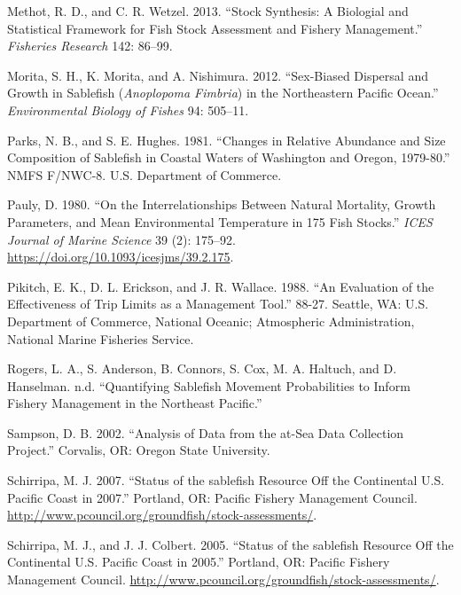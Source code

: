 \documentclass[11pt,
  english,
  a4paper,
]{article}
\newlength{\cslhangindent}
\newenvironment{cslreferences}%
  {\setlength{\parindent}{0pt}%
  \everypar{\setlength{\hangindent}{\cslhangindent}}\ignorespaces}%
  {\par}
\begin{document}
\begin{cslreferences}
\leavevmode\hypertarget{ref-MethotWetzel2013}{}%
Methot, R. D., and C. R. Wetzel. 2013. ``Stock Synthesis: A Biologial and Statistical Framework for Fish Stock Assessment and Fishery Management.'' \emph{Fisheries Research} 142: 86--99.

\leavevmode\hypertarget{ref-morita2012envbiofishsex}{}%
Morita, S. H., K. Morita, and A. Nishimura. 2012. ``Sex-Biased Dispersal and Growth in Sablefish (\emph{Anoplopoma Fimbria}) in the Northeastern Pacific Ocean.'' \emph{Environmental Biology of Fishes} 94: 505--11.

\leavevmode\hypertarget{ref-parks1981}{}%
Parks, N. B., and S. E. Hughes. 1981. ``Changes in Relative Abundance and Size Composition of Sablefish in Coastal Waters of Washington and Oregon, 1979-80.'' NMFS F/NWC-8. U.S. Department of Commerce.

\leavevmode\hypertarget{ref-pauly1980}{}%
Pauly, D. 1980. ``On the Interrelationships Between Natural Mortality, Growth Parameters, and Mean Environmental Temperature in 175 Fish Stocks.'' \emph{ICES Journal of Marine Science} 39 (2): 175--92. \url{https://doi.org/10.1093/icesjms/39.2.175}.

\leavevmode\hypertarget{ref-pikitch1988usdoc}{}%
Pikitch, E. K., D. L. Erickson, and J. R. Wallace. 1988. ``An Evaluation of the Effectiveness of Trip Limits as a Management Tool.'' 88-27. Seattle, WA: U.S. Department of Commerce, National Oceanic; Atmospheric Administration, National Marine Fisheries Service.

\leavevmode\hypertarget{ref-rogers2020}{}%
Rogers, L. A., S. Anderson, B. Connors, S. Cox, M. A. Haltuch, and D. Hanselman. n.d. ``Quantifying Sablefish Movement Probabilities to Inform Fishery Management in the Northeast Pacific.''

\leavevmode\hypertarget{ref-sampson2002}{}%
Sampson, D. B. 2002. ``Analysis of Data from the at-Sea Data Collection Project.'' Corvalis, OR: Oregon State University.

\leavevmode\hypertarget{ref-schirripa2007sablefish}{}%
Schirripa, M. J. 2007. ``Status of the sablefish Resource Off the Continental U.S. Pacific Coast in 2007.'' Portland, OR: Pacific Fishery Management Council. \url{http://www.pcouncil.org/groundfish/stock-assessments/}.

\leavevmode\hypertarget{ref-schirripa2005sablefish}{}%
Schirripa, M. J., and J. J. Colbert. 2005. ``Status of the sablefish Resource Off the Continental U.S. Pacific Coast in 2005.'' Portland, OR: Pacific Fishery Management Council. \url{http://www.pcouncil.org/groundfish/stock-assessments/}.


\end{cslreferences}
\end{document}
